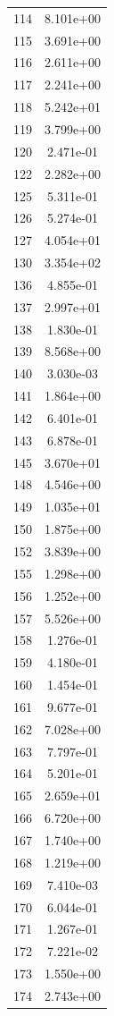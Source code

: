 \documentclass[12pt]{article}
\begin{document}
\begin{longtable}{@{}cc@{}}
114 & 8.101e+00 \\
115 & 3.691e+00 \\
116 & 2.611e+00 \\
117 & 2.241e+00 \\
118 & 5.242e+01 \\
119 & 3.799e+00 \\
120 & 2.471e-01 \\
122 & 2.282e+00 \\
125 & 5.311e-01 \\
126 & 5.274e-01 \\
127 & 4.054e+01 \\
130 & 3.354e+02 \\
136 & 4.855e-01 \\
137 & 2.997e+01 \\
138 & 1.830e-01 \\
139 & 8.568e+00 \\
140 & 3.030e-03 \\
141 & 1.864e+00 \\
142 & 6.401e-01 \\
143 & 6.878e-01 \\
145 & 3.670e+01 \\
148 & 4.546e+00 \\
149 & 1.035e+01 \\
150 & 1.875e+00 \\
152 & 3.839e+00 \\
155 & 1.298e+00 \\
156 & 1.252e+00 \\
157 & 5.526e+00 \\
158 & 1.276e-01 \\
159 & 4.180e-01 \\
160 & 1.454e-01 \\
161 & 9.677e-01 \\
162 & 7.028e+00 \\
163 & 7.797e-01 \\
164 & 5.201e-01 \\
165 & 2.659e+01 \\
166 & 6.720e+00 \\
167 & 1.740e+00 \\
168 & 1.219e+00 \\
169 & 7.410e-03 \\
170 & 6.044e-01 \\
171 & 1.267e-01 \\
172 & 7.221e-02 \\
173 & 1.550e+00 \\
174 & 2.743e+00 \\

\end{longtable}
\end{document}
